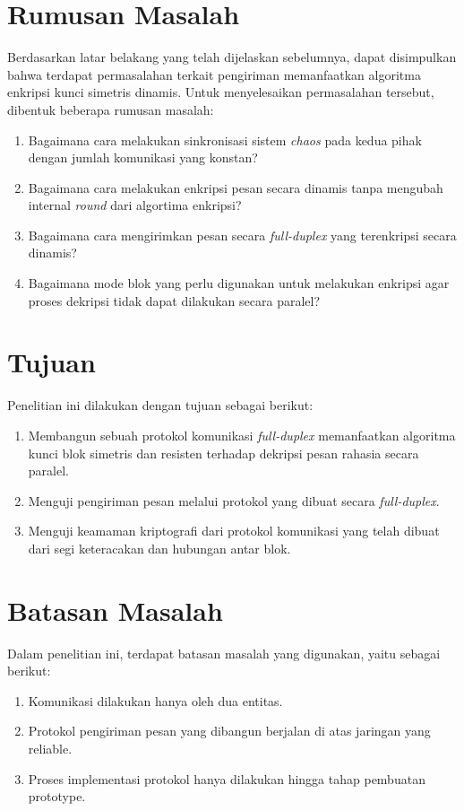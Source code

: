 \section{Rumusan Masalah}
Berdasarkan latar belakang yang telah dijelaskan sebelumnya, dapat disimpulkan bahwa terdapat permasalahan terkait pengiriman memanfaatkan algoritma enkripsi kunci simetris dinamis. Untuk menyelesaikan permasalahan tersebut, dibentuk beberapa rumusan masalah:
\begin{enumerate}
  \item Bagaimana cara melakukan sinkronisasi sistem \emph{chaos} pada kedua pihak dengan jumlah komunikasi yang konstan?
  \item Bagaimana cara melakukan enkripsi pesan secara dinamis tanpa mengubah internal \emph{round} dari algortima enkripsi?
  \item Bagaimana cara mengirimkan pesan secara \emph{full-duplex} yang terenkripsi secara dinamis?
  \item Bagaimana mode blok yang perlu digunakan untuk melakukan enkripsi agar proses dekripsi tidak dapat dilakukan secara paralel?
\end{enumerate}

\section{Tujuan}
Penelitian ini dilakukan dengan tujuan sebagai berikut:

\begin{enumerate}
  \item Membangun sebuah protokol komunikasi \emph{full-duplex} memanfaatkan algoritma kunci blok simetris dan resisten terhadap dekripsi pesan rahasia secara paralel.
  \item Menguji pengiriman pesan melalui protokol yang dibuat secara \emph{full-duplex}.
  \item Menguji keamaman kriptografi dari protokol komunikasi yang telah dibuat dari segi keteracakan dan hubungan antar blok.
\end{enumerate}

\section{Batasan Masalah}
Dalam penelitian ini, terdapat batasan masalah yang digunakan, yaitu sebagai berikut:
\begin{enumerate}
  \item Komunikasi dilakukan hanya oleh dua entitas.
  \item Protokol pengiriman pesan yang dibangun berjalan di atas jaringan yang reliable.
  \item Proses implementasi protokol hanya dilakukan hingga tahap pembuatan prototype.
\end{enumerate}

